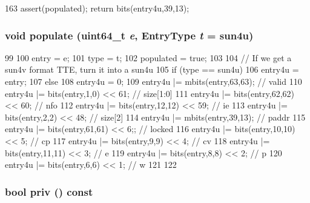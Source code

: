 \begin{DoxyCode}
163 { assert(populated); return bits(entry4u,39,13); }
\end{DoxyCode}
\hypertarget{classSparcISA_1_1PageTableEntry_af79a5e3d40cb4f820fc2e7be1da4b1a4}{
\subsubsection[{populate}]{\setlength{\rightskip}{0pt plus 5cm}void populate (uint64\_\-t {\em e}, \/  {\bf EntryType} {\em t} = {\ttfamily sun4u})}}
\label{classSparcISA_1_1PageTableEntry_af79a5e3d40cb4f820fc2e7be1da4b1a4}



\begin{DoxyCode}
99     {
100         entry = e;
101         type = t;
102         populated = true;
103 
104         // If we get a sun4v format TTE, turn it into a sun4u
105         if (type == sun4u)
106             entry4u = entry;
107         else {
108             entry4u = 0;
109             entry4u |= mbits(entry,63,63);         // valid
110             entry4u |= bits(entry,1,0) << 61;      // size[1:0]
111             entry4u |= bits(entry,62,62) << 60;    // nfo
112             entry4u |= bits(entry,12,12) << 59;    // ie
113             entry4u |= bits(entry,2,2) << 48;      // size[2]
114             entry4u |= mbits(entry,39,13);         // paddr
115             entry4u |= bits(entry,61,61) << 6;;    // locked
116             entry4u |= bits(entry,10,10) << 5;     // cp
117             entry4u |= bits(entry,9,9) << 4;       // cv
118             entry4u |= bits(entry,11,11) << 3;     // e
119             entry4u |= bits(entry,8,8) << 2;       // p
120             entry4u |= bits(entry,6,6) << 1;       // w
121         }
122     }
\end{DoxyCode}
\hypertarget{classSparcISA_1_1PageTableEntry_a77228daa47c7168c944bb120a22dba3f}{
\subsubsection[{priv}]{\setlength{\rightskip}{0pt plus 5cm}bool priv () const}}
\label{classSparcISA_1_1PageTableEntry_a77228daa47c7168c944bb120a22dba3f}



